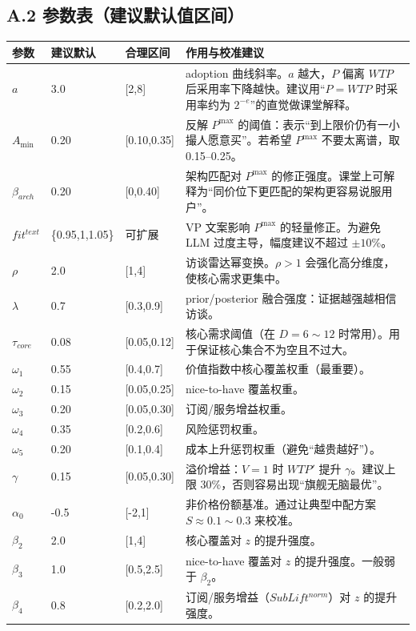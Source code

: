 \documentclass[UTF8,12pt]{ctexart}
\begin{document}
\subsection{A.2 参数表（建议默认值区间）}
\begin{longtable}{p{}p{}p{}p{}}
\toprule
参数 & 建议默认 & 合理区间 & 作用与校准建议\\
\midrule
$a$ & 3.0 & [2,8] & adoption 曲线斜率。$a$ 越大，$P$ 偏离 $WTP$ 后采用率下降越快。建议用“$P=WTP$ 时采用率约为 $2^{-e}$”的直觉做课堂解释。\\
$A_{\min}$ & 0.20 & [0.10,0.35] & 反解 $P^{\max}$ 的阈值：表示“到上限价仍有一小撮人愿意买”。若希望 $P^{\max}$ 不要太离谱，取 0.15--0.25。\\
$\beta_{arch}$ & 0.20 & [0,0.40] & 架构匹配对 $P^{\max}$ 的修正强度。课堂上可解释为“同价位下更匹配的架构更容易说服用户”。\\
$fit^{text}$ & \{0.95,1,1.05\} & 可扩展 & VP 文案影响 $P^{\max}$ 的轻量修正。为避免 LLM 过度主导，幅度建议不超过 $\pm 10\%$。\\
$\rho$ & 2.0 & [1,4] & 访谈雷达幂变换。$\rho>1$ 会强化高分维度，使核心需求更集中。\\
$\lambda$ & 0.7 & [0.3,0.9] & prior/posterior 融合强度：证据越强越相信访谈。\\
$\tau_{core}$ & 0.08 & [0.05,0.12] & 核心需求阈值（在 $D=6\sim 12$ 时常用）。用于保证核心集合不为空且不过大。\\
$\omega_1$ & 0.55 & [0.4,0.7] & 价值指数中核心覆盖权重（最重要）。\\
$\omega_2$ & 0.15 & [0.05,0.25] & nice-to-have 覆盖权重。\\
$\omega_3$ & 0.20 & [0.05,0.30] & 订阅/服务增益权重。\\
$\omega_4$ & 0.35 & [0.2,0.6] & 风险惩罚权重。\\
$\omega_5$ & 0.20 & [0.1,0.4] & 成本上升惩罚权重（避免“越贵越好”）。\\
$\gamma$ & 0.15 & [0.05,0.30] & 溢价增益：$V=1$ 时 $WTP'$ 提升 $\gamma$。建议上限 30\%，否则容易出现“旗舰无脑最优”。\\
$\alpha_0$ & -0.5 & [-2,1] & 非价格份额基准。通过让典型中配方案 $S\approx 0.1\sim 0.3$ 来校准。\\
$\beta_2$ & 2.0 & [1,4] & 核心覆盖对 $z$ 的提升强度。\\
$\beta_3$ & 1.0 & [0.5,2.5] & nice-to-have 覆盖对 $z$ 的提升强度。一般弱于 $\beta_2$。\\
$\beta_4$ & 0.8 & [0.2,2.0] & 订阅/服务增益（$SubLift^{norm}$）对 $z$ 的提升强度。\\

\end{longtable}
\end{document}

